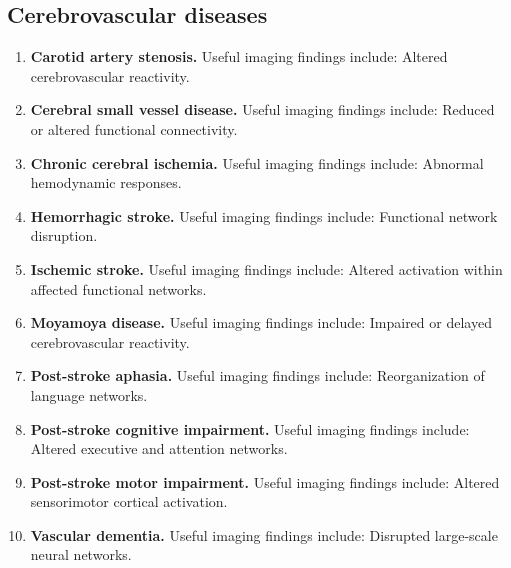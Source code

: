\subsection{Cerebrovascular diseases}
\begin{enumerate}[leftmargin=*,itemsep=0.45em,topsep=0.4em]
\item \textbf{Carotid artery stenosis.} Useful imaging findings include: Altered cerebrovascular reactivity.
\item \textbf{Cerebral small vessel disease.} Useful imaging findings include: Reduced or altered functional connectivity.
\item \textbf{Chronic cerebral ischemia.} Useful imaging findings include: Abnormal hemodynamic responses.
\item \textbf{Hemorrhagic stroke.} Useful imaging findings include: Functional network disruption.
\item \textbf{Ischemic stroke.} Useful imaging findings include: Altered activation within affected functional networks.
\item \textbf{Moyamoya disease.} Useful imaging findings include: Impaired or delayed cerebrovascular reactivity.
\item \textbf{Post-stroke aphasia.} Useful imaging findings include: Reorganization of language networks.
\item \textbf{Post-stroke cognitive impairment.} Useful imaging findings include: Altered executive and attention networks.
\item \textbf{Post-stroke motor impairment.} Useful imaging findings include: Altered sensorimotor cortical activation.
\item \textbf{Vascular dementia.} Useful imaging findings include: Disrupted large-scale neural networks.
\end{enumerate}

